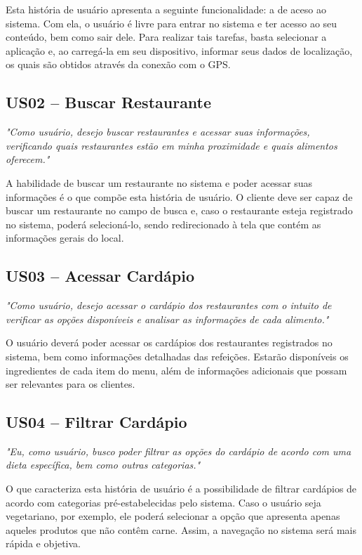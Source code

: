 Esta história de usuário apresenta a seguinte funcionalidade: a de aceso ao sistema. Com ela, o usuário é livre para entrar no sistema e ter acesso ao seu conteúdo, bem como sair dele. Para realizar tais tarefas, basta selecionar a aplicação e, ao carregá-la em seu dispositivo, informar seus dados de localização, os quais são obtidos através da conexão com o GPS.

\subsection{US02 -- Buscar Restaurante}

\textit{"Como usuário, desejo buscar restaurantes e acessar suas informações,  verificando quais restaurantes estão em minha proximidade e quais alimentos oferecem."}

A habilidade de buscar um restaurante no sistema e poder acessar suas informações é o que compõe esta história de usuário. O cliente deve ser capaz de buscar um restaurante no campo de busca e, caso o restaurante esteja registrado no sistema, poderá selecioná-lo, sendo redirecionado à tela que contém as informações gerais do local. 

\subsection{US03 -- Acessar Cardápio}

\textit{"Como usuário, desejo acessar o cardápio dos restaurantes com o intuito de verificar as opções disponíveis e analisar as informações de cada alimento."}

O usuário deverá poder acessar os cardápios dos restaurantes registrados no sistema, bem como informações detalhadas das refeições. Estarão disponíveis os ingredientes de cada item do menu, além de informações adicionais que possam ser relevantes para os clientes.

\subsection{US04 -- Filtrar Cardápio}

\textit{"Eu, como usuário, busco poder filtrar as opções do cardápio de acordo com uma dieta específica, bem como outras categorias."}

O que caracteriza esta história de usuário é a possibilidade de filtrar cardápios de acordo com categorias pré-estabelecidas pelo sistema. Caso o usuário seja vegetariano, por exemplo, ele poderá selecionar a opção que apresenta apenas aqueles produtos que não contêm carne. Assim, a navegação no sistema será mais rápida e objetiva.

